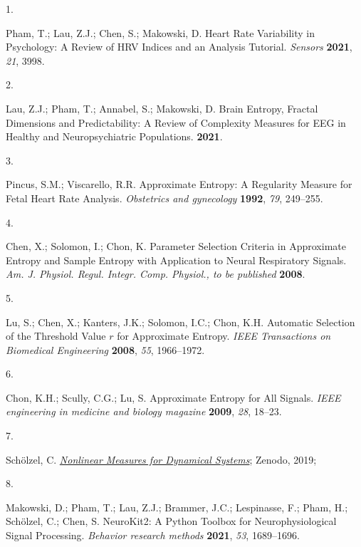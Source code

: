 \documentclass[
  man]{apa6}
\newlength{\cslhangindent}
\newlength{\csllabelwidth}
\newlength{\cslentryspacingunit} %
\newenvironment{CSLReferences}[2] %
 {%
  \setlength{\parindent}{0pt}
  \ifodd #1
  \let\oldpar\par
  \def\par{\hangindent=\cslhangindent\oldpar}
  \fi
  \setlength{\parskip}{#2\cslentryspacingunit}
 }%
 {}
\newcommand{\CSLLeftMargin}[1]{\parbox[t]{\csllabelwidth}{#1}}
\newcommand{\CSLRightInline}[1]{\parbox[t]{\linewidth - \csllabelwidth}{#1}\break}
\begin{document}
\hypertarget{refs}{}
\begin{CSLReferences}{0}{0}
\leavevmode{}%
\CSLLeftMargin{1. }%
\CSLRightInline{Pham, T.; Lau, Z.J.; Chen, S.; Makowski, D. Heart Rate Variability in Psychology: A Review of HRV Indices and an Analysis Tutorial. \emph{Sensors} \textbf{2021}, \emph{21}, 3998.}

\leavevmode{}%
\CSLLeftMargin{2. }%
\CSLRightInline{Lau, Z.J.; Pham, T.; Annabel, S.; Makowski, D. Brain Entropy, Fractal Dimensions and Predictability: A Review of Complexity Measures for EEG in Healthy and Neuropsychiatric Populations. \textbf{2021}.}

\leavevmode{}%
\CSLLeftMargin{3. }%
\CSLRightInline{Pincus, S.M.; Viscarello, R.R. Approximate Entropy: A Regularity Measure for Fetal Heart Rate Analysis. \emph{Obstetrics and gynecology} \textbf{1992}, \emph{79}, 249--255.}

\leavevmode{}%
\CSLLeftMargin{4. }%
\CSLRightInline{Chen, X.; Solomon, I.; Chon, K. Parameter Selection Criteria in Approximate Entropy and Sample Entropy with Application to Neural Respiratory Signals. \emph{Am. J. Physiol. Regul. Integr. Comp. Physiol., to be published} \textbf{2008}.}

\leavevmode{}%
\CSLLeftMargin{5. }%
\CSLRightInline{Lu, S.; Chen, X.; Kanters, J.K.; Solomon, I.C.; Chon, K.H. Automatic Selection of the Threshold Value \(r\) for Approximate Entropy. \emph{IEEE Transactions on Biomedical Engineering} \textbf{2008}, \emph{55}, 1966--1972.}

\leavevmode{}%
\CSLLeftMargin{6. }%
\CSLRightInline{Chon, K.H.; Scully, C.G.; Lu, S. Approximate Entropy for All Signals. \emph{IEEE engineering in medicine and biology magazine} \textbf{2009}, \emph{28}, 18--23.}

\leavevmode{}%
\CSLLeftMargin{7. }%
\CSLRightInline{Schölzel, C. \emph{\href{https://doi.org/10.5281/zenodo.3814723}{Nonlinear Measures for Dynamical Systems}}; Zenodo, 2019;}

\leavevmode{}%
\CSLLeftMargin{8. }%
\CSLRightInline{Makowski, D.; Pham, T.; Lau, Z.J.; Brammer, J.C.; Lespinasse, F.; Pham, H.; Schölzel, C.; Chen, S. NeuroKit2: A Python Toolbox for Neurophysiological Signal Processing. \emph{Behavior research methods} \textbf{2021}, \emph{53}, 1689--1696.}

\end{CSLReferences}


\clearpage
\renewcommand{\listfigurename}{Figure captions}
\end{document}
